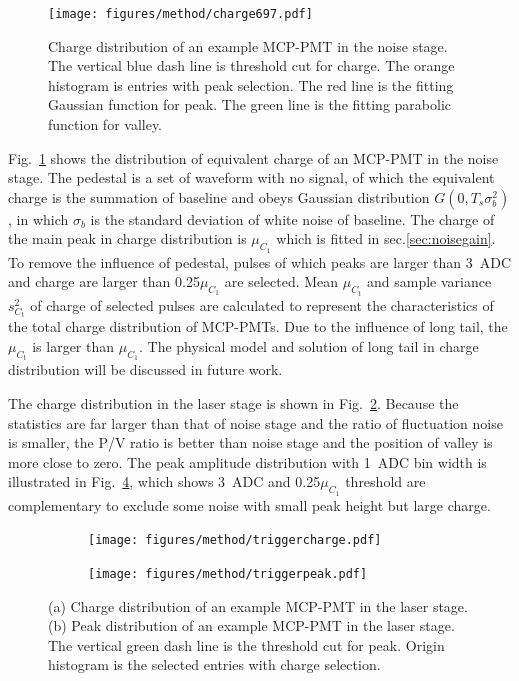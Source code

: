 \begin{figure}[!htbp]
    \centering
    \texttt{[image: figures/method/charge697.pdf]}
    \caption{Charge distribution of an example MCP-PMT in the noise stage. The vertical blue dash line is threshold cut for charge. The orange histogram is entries with peak selection. The red line is the fitting Gaussian function for peak. The green line is the fitting parabolic function for valley.}
    \label{fig:charge}
\end{figure}

Fig.~\ref{fig:charge} shows the distribution of equivalent charge of an MCP-PMT in the noise stage. The pedestal is a set of waveform with no signal, of which the equivalent charge is the summation of baseline and obeys Gaussian distribution $G(0, T_s\sigma_b^2)$, in which $\sigma_b$ is the standard deviation of white noise of baseline. The charge of the main peak in charge distribution is $\mu_{C_1}$ which is fitted in sec.\ref{sec:noisegain}. To remove the influence of pedestal, pulses of which peaks are larger than \SI{3}{ADC} and charge are larger than 0.25$\mu_{C_1}$ are selected. Mean $\mu_{C_{\mathrm{t}}}$ and sample variance $s^2_{C_{\mathrm{t}}}$ of charge of selected pulses are calculated to represent the characteristics of the total charge distribution of MCP-PMTs. Due to the influence of long tail, the $\mu_{C_{\mathrm{t}}}$ is larger than $\mu_{C_1}$. The physical model and solution of long tail in charge distribution will be discussed in future work.

The charge distribution in the laser stage is shown in Fig.~\ref{fig:triggercharge}. Because the statistics are far larger than that of noise stage and the ratio of fluctuation noise is smaller, the P/V ratio is better than noise stage and the position of valley is more close to zero. The peak amplitude distribution with \SI{1}{ADC} bin width is illustrated in Fig.~\ref{fig:triggerpeak}, which shows \SI{3}{ADC} and 0.25$\mu_{C_1}$ threshold are complementary to exclude some noise with small peak height but large charge.

\begin{figure}[!htbp]
    \centering
    \begin{subfigure}[b]{0.4\textwidth}
        \texttt{[image: figures/method/triggercharge.pdf]}
        \caption{}%
        \label{fig:triggercharge}
    \end{subfigure}
    \begin{subfigure}[b]{0.4\textwidth}
        \texttt{[image: figures/method/triggerpeak.pdf]}
        \caption{}%
        \label{fig:triggerpeak}
    \end{subfigure}
    \caption{(a) Charge distribution of an example MCP-PMT in the laser stage. (b) Peak distribution of an example MCP-PMT in the laser stage. The vertical green dash line is the threshold cut for peak. Origin histogram is the selected entries with charge selection.}
\end{figure}

